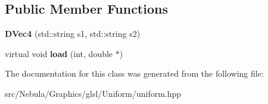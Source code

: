 \subsection*{\-Public \-Member \-Functions}
\begin{DoxyCompactItemize}
\item 
\hypertarget{classNeb_1_1glsl_1_1Uniform_1_1Vector_1_1DVec4_a254fb963ff4b99ac68c62d89c67e717d}{{\bfseries \-D\-Vec4} (std\-::string s1, std\-::string s2)}\label{classNeb_1_1glsl_1_1Uniform_1_1Vector_1_1DVec4_a254fb963ff4b99ac68c62d89c67e717d}

\item 
\hypertarget{classNeb_1_1glsl_1_1Uniform_1_1Vector_1_1DVec4_ab03fde9830f3d081d04523701da594e3}{virtual void {\bfseries load} (int, double $\ast$)}\label{classNeb_1_1glsl_1_1Uniform_1_1Vector_1_1DVec4_ab03fde9830f3d081d04523701da594e3}

\end{DoxyCompactItemize}


\-The documentation for this class was generated from the following file\-:\begin{DoxyCompactItemize}
\item 
src/\-Nebula/\-Graphics/glsl/\-Uniform/uniform.\-hpp\end{DoxyCompactItemize}
